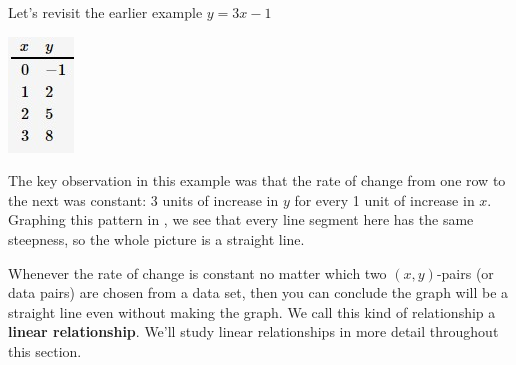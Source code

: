 \documentclass{ximera}
\begin{document}
Let's revisit the earlier example $y=3x-1$

\includegraphics{2-2table3.jpg}

The key observation in this example was that the rate of change from one row to the next was constant: 3 units of increase in $y$ for every 1  unit of increase in $x$. Graphing this pattern in , we see that every line segment here has the same steepness, so the whole picture is a straight line.


Whenever the rate of change is constant no matter which two $(x,y)$-pairs (or data pairs) are chosen from a data set, then you can conclude the graph will be a straight line even without making the graph. We call this kind of relationship a \textbf{linear relationship}. We'll study linear relationships in more detail throughout this section.
\end{document}
